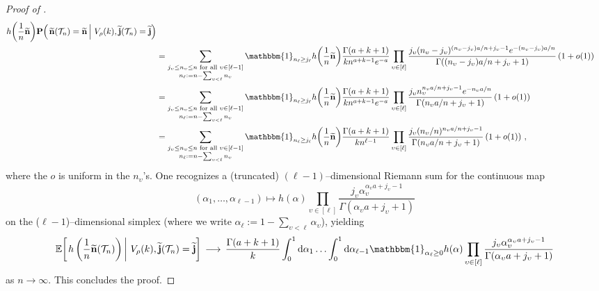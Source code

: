 \documentclass{article}
\theoremstyle{remark}
\newcommand{\cv}[1]{\,\underset{#1}{\longrightarrow}\,}
\newcommand{\cT}{\mathcal{T}}
\newcommand{\bj}{\mathbf{j}}
\newcommand{\bn}{\mathbf{n}}
\newcommand{\wbj}{\widetilde{\bj}}
\newcommand{\wbn}{\widetilde{\bn}}
\newcommand{\expecond}[2]{\mathbb{E}{\left[\left. #1 \,\right|\, #2 \right]}}
\newcommand{\probcond}[2]{\mathbf{P}{\left(\left. #1 \,\right|\, #2 \right)}}
\newcommand{\One}[1]{\mathbbm{1}_{#1}}
\begin{document}
\begin{proof}[Proof of ]
\begin{align*}
        h{\left(\frac1n\wbn\right)}
        \probcond{\Big. \wbn(\cT_n)=\wbn}{V_\rho(k), \wbj(\cT_n)=\wbj} 
        \\&= \sum_{\substack{j_\upsilon\le n_\upsilon\le n \text{ for all }\upsilon\in[\ell-1]\\ n_{\ell}:= n- \sum_{\upsilon<\ell} n_\upsilon}}
        \One{n_\ell\ge j_\ell}
        h{\left(\frac1n\wbn\right)}
        \frac{\Gamma(a+k+1)}{k n^{a+k-1} e^{-a}} \prod_{\upsilon\in[\ell]} \frac{j_\upsilon (n_\upsilon-j_\upsilon)^{(n_\upsilon-j_\upsilon) a/n +j_\upsilon -1} e^{-(n_\upsilon-j_\upsilon) a/n}}{\Gamma((n_\upsilon-j_\upsilon) a/n+j_\upsilon+1)} \left(1+o(1)\right)
        \\&= \sum_{\substack{j_\upsilon\le n_\upsilon\le n \text{ for all }\upsilon\in[\ell-1]\\ n_{\ell}:= n- \sum_{\upsilon<\ell} n_\upsilon}}
        \One{n_\ell\ge j_\ell}
        h{\left(\frac1n\wbn\right)}
        \frac{\Gamma(a+k+1)}{k n^{a+k-1} e^{-a}} \prod_{\upsilon\in[\ell]} \frac{j_\upsilon n_\upsilon^{n_\upsilon a/n +j_\upsilon -1} e^{-n_\upsilon a/n}}{\Gamma(n_\upsilon a/n+ j_\upsilon +1)} \left(1+o(1)\right)
        \\&= \sum_{\substack{j_\upsilon\le n_\upsilon\le n \text{ for all }\upsilon\in[\ell-1]\\ n_{\ell}:= n- \sum_{\upsilon<\ell} n_\upsilon}}
        \One{n_\ell\ge j_\ell}
        h{\left(\frac1n\wbn\right)}
        \frac{\Gamma(a+k+1)}{k n^{\ell-1}} \prod_{\upsilon\in[\ell]} \frac{j_\upsilon (n_\upsilon/n)^{n_\upsilon a/n +j_\upsilon -1}}{\Gamma(n_\upsilon a/n+ j_\upsilon +1)} \left(1+o(1)\right)\,,
    \end{align*}
    where the $o$ is uniform in the $n_\upsilon$'s.
    One recognizes a (truncated) $(\ell-1)$--dimensional Riemann sum for the continuous map 
    \begin{equation*}
        (\alpha_1, \dots, \alpha_{\ell-1}) \mapsto 
        h{\left(\alpha\right)}
        \prod_{\upsilon\in[\ell]} \frac{j_\upsilon \alpha_\upsilon^{\alpha_\upsilon a +j_\upsilon-1}}{\Gamma(\alpha_\upsilon a+j_\upsilon +1)}
    \end{equation*}
    on the ($\ell\!-\!1$)--dimensional simplex 
    (where we write $\alpha_\ell := 1 - \sum_{\upsilon<\ell} \alpha_\upsilon$), yielding
    \begin{align}
    \label{eq:strange computation}
        \expecond{ h\left(\frac1n\wbn(\cT_n)\right) }{V_\rho(k), \wbj(\cT_n)=\wbj} 
        \cv{} \frac{\Gamma(a+k+1)}{k} 
        \int_{0}^{1} \mathrm{d}\alpha_1 \ldots \int_{0}^{1} \mathrm{d}\alpha_{\ell-1} \One{\alpha_\ell\ge0}
        h(\alpha) \prod_{\upsilon\in[\ell]} \frac{j_\upsilon \alpha_\upsilon^{\alpha_\upsilon a +j_\upsilon -1}}{\Gamma(\alpha_\upsilon a+j_\upsilon +1)}
    \end{align}
    as $n\to\infty$.
    This concludes the proof.
\end{proof}
\end{document}
